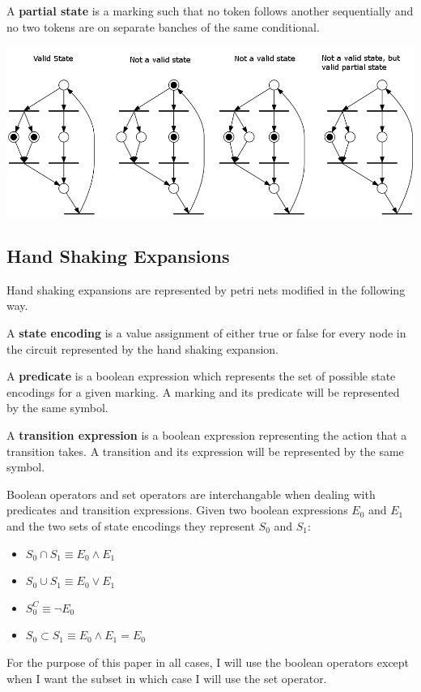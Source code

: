 \begin{definition}
A \textbf{partial state} is a marking such that no token follows another sequentially and no two tokens are on separate banches of the same conditional.
\end{definition}

\begin{center}
\includegraphics[scale=0.475]{figures/state.png}
\end{center}

\subsection{Hand Shaking Expansions}

Hand shaking expansions are represented by petri nets modified in the following way.

\begin{definition}
A \textbf{state encoding} is a value assignment of either true or false for every node in the circuit represented by the hand shaking expansion.
\end{definition}

\begin{definition}
A \textbf{predicate} is a boolean expression which represents the set of possible state encodings for a given marking. A marking and its predicate will be represented by the same symbol.
\end{definition}

\begin{definition}
A \textbf{transition expression} is a boolean expression representing the action that a transition takes. A transition and its expression will be represented by the same symbol.
\end{definition}

Boolean operators and set operators are interchangable when dealing with predicates and transition expressions. Given two boolean expressions $E_0$ and $E_1$ and the two sets of state encodings they represent $S_0$ and $S_1$:
\begin{itemize}
\item $S_0 \cap S_1 \equiv E_0 \wedge E_1$
\item $S_0 \cup S_1 \equiv E_0 \vee E_1$
\item $S_0^C \equiv \neg E_0$
\item $S_0 \subset S_1 \equiv E_0 \wedge E_1 = E_0$
\end{itemize}
For the purpose of this paper in all cases, I will use the boolean operators except when I want the subset in which case I will use the set operator.


